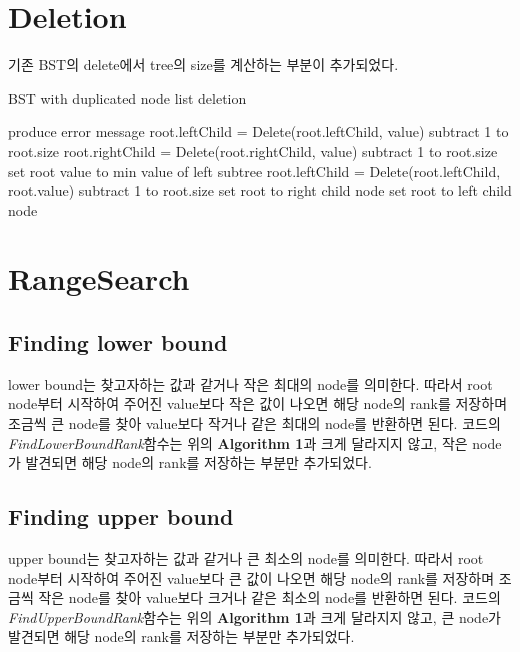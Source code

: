 \documentclass[a4paper, 11pt]{article}
\begin{document}
\section{Deletion}
기존 BST의 delete에서 tree의 size를 계산하는 부분이 추가되었다.

\begin{algorithm}
	\caption{BST with duplicated node list deletion}
	\begin{algorithmic}
				produce error message
				\State root.leftChild = Delete(root.leftChild, value)
				\State subtract 1 to root.size
				\State root.rightChild = Delete(root.rightChild, value)
				\State subtract 1 to root.size
				\State set root value to min value of left subtree
				\State root.leftChild = Delete(root.leftChild, root.value)
				\State subtract 1 to root.size
			\Else
				set root to right child node
				set root to left child node
				\EndIf
			\EndIf
		\EndFunction
	\end{algorithmic}
\end{algorithm}
\pagebreak

\section{RangeSearch}
 
\subsection{Finding lower bound}
lower bound는 찾고자하는 값과 같거나 작은 최대의 node를 의미한다. 따라서 root node부터 시작하여 주어진 value보다 작은 값이 나오면 해당 node의 rank를 저장하며 조금씩 큰 node를 찾아 value보다 작거나 같은 최대의 node를 반환하면 된다. 코드의 \emph{FindLowerBoundRank}함수는 위의 \textbf{Algorithm 1}과 크게 달라지지 않고, 작은 node가 발견되면 해당 node의 rank를 저장하는 부분만 추가되었다.

\subsection{Finding upper bound}
upper bound는 찾고자하는 값과 같거나 큰 최소의 node를 의미한다. 따라서 root node부터 시작하여 주어진 value보다 큰 값이 나오면 해당 node의 rank를 저장하며 조금씩 작은 node를 찾아 value보다 크거나 같은 최소의 node를 반환하면 된다. 코드의 \emph{FindUpperBoundRank}함수는 위의 \textbf{Algorithm 1}과 크게 달라지지 않고, 큰 node가 발견되면 해당 node의 rank를 저장하는 부분만 추가되었다.
\end{document}
